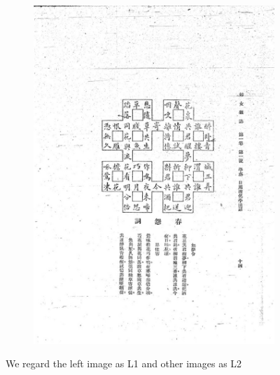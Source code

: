 \documentclass{beamer}
\begin{document}
\begin{frame}
\begin{figure}[htbp]
\begin{subfigure}[b]{0.23\linewidth}
            \includegraphics[height=1.3\linewidth]{./figures/fnzz4}
        \end{subfigure}
        \caption{We regard the left image as L1 and other images as L2}
    \end{figure}
\end{frame}
\end{document}
